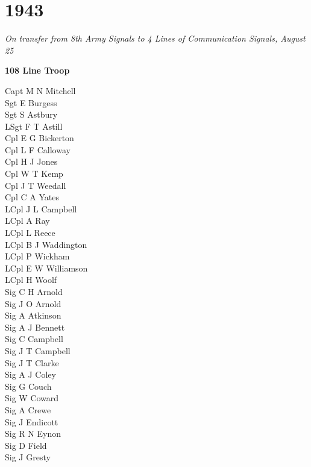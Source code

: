 \chapter*{1943}

\begin{center}
  \textit{On transfer from 8th Army Signals to 4 Lines of Communication Signals, August 25}
\end{center}

\begin{center}
  \Large
  \textbf{108 Line Troop}
\end{center}

\begin{multicols}{2}
  \noindent
  Capt M N Mitchell \\
  Sgt E Burgess \\
  Sgt S Astbury \\
  LSgt F T Astill \\
  Cpl E G Bickerton \\
  Cpl L F Calloway \\
  Cpl H J Jones \\
  Cpl W T Kemp \\
  Cpl J T Weedall \\
  Cpl C A Yates \\
  LCpl J L Campbell \\
  LCpl A Ray \\
  LCpl L Reece \\
  LCpl B J Waddington \\
  LCpl P Wickham \\
  LCpl E W Williamson \\
  LCpl H Woolf \\
  Sig C H Arnold \\
  Sig J O Arnold \\
  Sig A Atkinson \\
  Sig A J Bennett \\
  Sig C Campbell \\
  Sig J T Campbell \\
  Sig J T Clarke \\
  Sig A J Coley \\
  Sig G Couch \\
  Sig W Coward \\
  Sig A Crewe \\
  Sig J Endicott \\
  Sig R N Eynon \\
  Sig D Field \\
  Sig J Gresty \\

\end{multicols}
